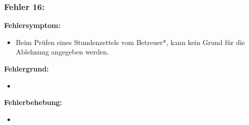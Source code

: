 \subsubsection{Fehler 16:}%
\textbf{Fehlersymptom:}
	\begin{itemize}
		\item Beim Prüfen eines Stundenzettels vom Betreuer*, kann kein Grund für die Ablehnung angegeben werden.
	\end{itemize}
\textbf{Fehlergrund:}
	\begin{itemize}
		\item 
	\end{itemize}
\textbf{Fehlerbehebung:}
	\begin{itemize}
		\item 
	\end{itemize}
